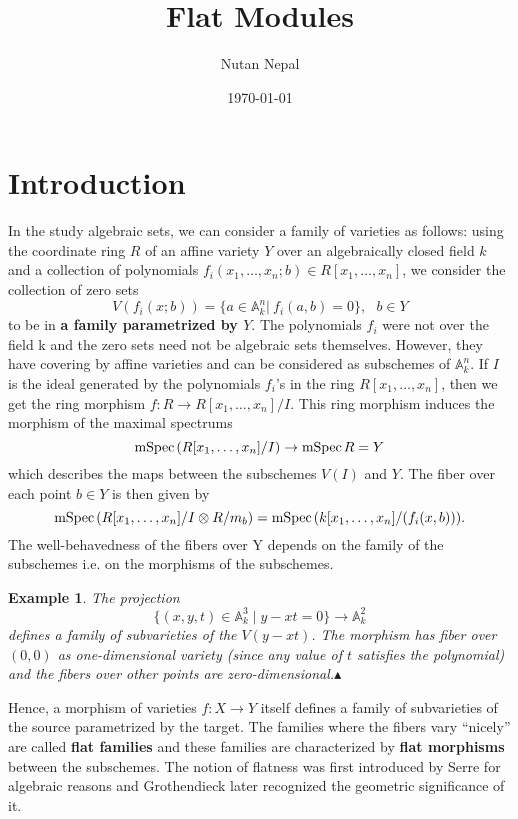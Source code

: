 \documentclass[12pt]{article}
\title{Flat Modules}
\author{Nutan Nepal}
\date{\today}
\theoremstyle{mytheoremstyle}
\newtheorem{example}{Example}
\newcommand{\bA}{\mathbb{A}}
\newcommand{\mspec}{\text{mSpec\hspace*{.5mm}}}
\begin{document}
\maketitle

\makebox[\linewidth]{\rule{200mm}{1pt}}
\section{Introduction}
\hspace*{8mm}In the study algebraic sets, we can consider a family of varieties as
follows: using the coordinate ring $R$ of an
affine variety $Y$ over an algebraically closed field $k$ and a collection
of polynomials $f_i(x_1,\ldots,x_n; b)\in R[x_1,\ldots,x_n]$, we consider
the collection of zero sets
$$V(f_i(x;b))=\{a\in \mathbb{A}^n_k|\ f_i(a,b)=0\},\ \ \ b\in Y$$ to be
in \textbf{a family parametrized by $Y$}. The polynomials $f_i$ were not over the
field k and the zero sets need not be algebraic sets themselves. However,
they have covering by affine varieties and can be considered
as subschemes of $\bA^n_k$.
If $I$ is the ideal generated by the polynomials $f_i$'s
in the ring $R[x_1,\ldots,x_n]$,
then we get the ring morphism $f:R\to R[x_1,\ldots,x_n]/I$.
This ring morphism induces the morphism of the maximal spectrums
$$\mspec (R[x_1,\ldots,x_n]/I) \to \mspec R = Y$$
which describes the maps between the subschemes $V(I)$ and $Y$.
The fiber over each point $b\in Y$ is then given by
$$\mspec (R[x_1,\ldots,x_n]/I\otimes R/m_b)=\mspec (k[x_1,\ldots,x_n]
/(f_i(x,b))).$$
The well-behavedness of the fibers over Y depends on the family of
the subschemes i.e. on the morphisms of the subschemes.
\begin{example}
    The projection
    $$\{(x,y,t)\in \bA^3_k\mid y-xt=0\}\to \bA^2_k$$
    defines a family of subvarieties of the $V(y-xt)$.
    The morphism has fiber over $(0,0)$ as one-dimensional variety
    (since any value of $t$
    satisfies the polynomial) and the fibers over other points are
    zero-dimensional.$\blacktriangle$
\end{example}

Hence, a morphism of varieties $f:X\to Y$ itself defines a family of subvarieties
of the source parametrized by the target. The families where the
fibers vary ``nicely'' are called \textbf{flat families} and these
families are characterized by \textbf{flat morphisms} between
the subschemes. The notion of flatness was first introduced by
Serre for algebraic reasons and Grothendieck later recognized the
geometric significance of it.
\end{document}
